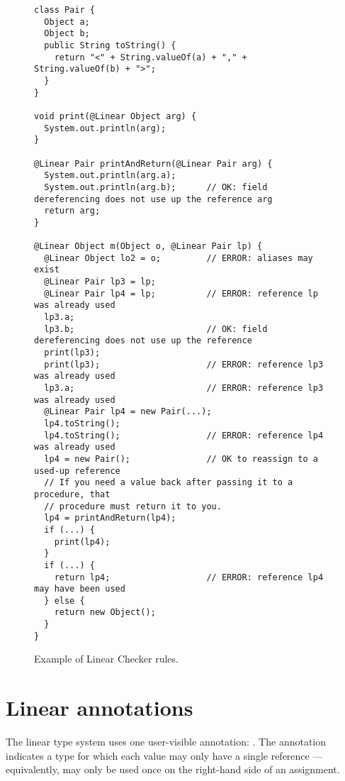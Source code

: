 \begin{figure}
\begin{smaller}
\begin{Verbatim}
class Pair {
  Object a;
  Object b;
  public String toString() {
    return "<" + String.valueOf(a) + "," + String.valueOf(b) + ">";
  }
}

void print(@Linear Object arg) {
  System.out.println(arg);
}

@Linear Pair printAndReturn(@Linear Pair arg) {
  System.out.println(arg.a);
  System.out.println(arg.b);      // OK: field dereferencing does not use up the reference arg
  return arg;
}

@Linear Object m(Object o, @Linear Pair lp) {
  @Linear Object lo2 = o;         // ERROR: aliases may exist
  @Linear Pair lp3 = lp;          
  @Linear Pair lp4 = lp;          // ERROR: reference lp was already used
  lp3.a;                            
  lp3.b;                          // OK: field dereferencing does not use up the reference
  print(lp3);
  print(lp3);                     // ERROR: reference lp3 was already used
  lp3.a;                          // ERROR: reference lp3 was already used
  @Linear Pair lp4 = new Pair(...);
  lp4.toString();
  lp4.toString();                 // ERROR: reference lp4 was already used
  lp4 = new Pair();               // OK to reassign to a used-up reference
  // If you need a value back after passing it to a procedure, that
  // procedure must return it to you.
  lp4 = printAndReturn(lp4);
  if (...) {
    print(lp4);
  }
  if (...) {
    return lp4;                   // ERROR: reference lp4 may have been used
  } else {
    return new Object();
  }
}
\end{Verbatim}
\end{smaller}
\caption{Example of Linear Checker rules.}
\label{fig-linear-example}
\end{figure}


\section{Linear annotations\label{linear-annotations}}

The linear type system uses one user-visible annotation:
.  The annotation indicates
a type for which each value may only have a single reference ---
equivalently, may only be used once on the right-hand side of an
assignment.

